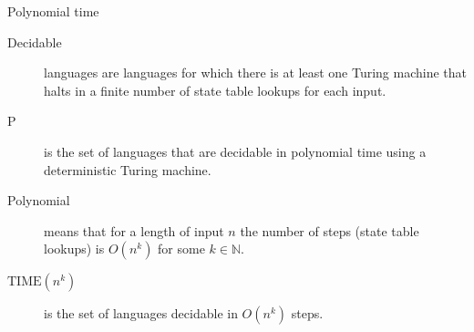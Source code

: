 \begin{frame}{Polynomial time}
  
  \begin{description}
    \item[Decidable] languages are languages for which there is at least one Turing machine that halts in a finite number of state table lookups for each input.
    \item[P] is the set of languages that are decidable in polynomial time using a deterministic Turing machine.
    \item[Polynomial] means that for a length of input $n$ the number of steps (state table lookups) is $O(n^k)$ for some $k \in \mathbb{N}$.
    \item[$\text{TIME}(n^k)$] is the set of languages decidable in $O(n^k)$ steps.
  \end{description}

\end{frame}